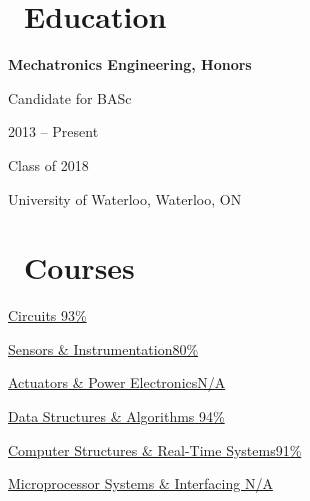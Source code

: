 \documentclass{resume}
\begin{document}
\begin{multicols}{2}

\section{\faGraduationCap\ Education}
\textbf{Mechatronics Engineering, Honors}\par
Candidate for BASc\par
2013 -- Present\par
Class of 2018\par
University of Waterloo, Waterloo, ON

\columnbreak

\section{\faBook\ Courses}
\href{http://www.ucalendar.uwaterloo.ca/1516/COURSE/course-MTE.html#MTE120}{Circuits \hfill 93\%} \par
\href{http://www.ucalendar.uwaterloo.ca/1516/COURSE/course-MTE.html#MTE220}{Sensors \& Instrumentation\hfill 80\%}\par
\href{http://www.ucalendar.uwaterloo.ca/1516/COURSE/course-MTE.html#MTE320}{Actuators \& Power Electronics\hfill N/A}\par

\href{http://www.ucalendar.uwaterloo.ca/1516/COURSE/course-MTE.html#MTE262}{Data Structures \& Algorithms \hfill 94\%}\par
\href{http://www.ucalendar.uwaterloo.ca/1516/COURSE/course-MTE.html#MTE241}{Computer Structures \& Real-Time Systems\hfill 91\%}\par
\href{http://www.ucalendar.uwaterloo.ca/1516/COURSE/course-MTE.html#MTE341}{Microprocessor Systems \& Interfacing \hfill N/A}

\end{multicols}
\end{document}
